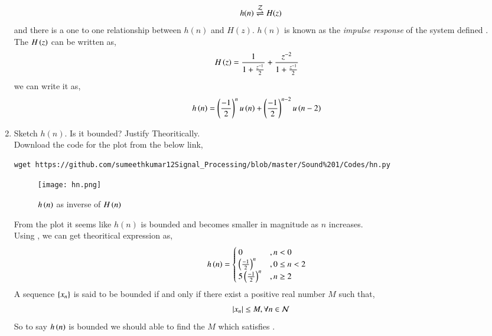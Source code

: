 \documentclass[journal,12pt,twocolumn]{IEEEtran}
\renewcommand\thesection{\arabic{section}}
\begin{document}
\begin{enumerate}[label=\thesection.\arabic*]
\begin{equation}
        h(n) \overset{\mathcal{Z}}{ \rightleftharpoons} H(z)
      \end{equation}
      and there is a one to one relationship between $h(n)$ and $H(z)$. $h(n)$ is known as the {\em impulse response} of the system defined .\\ 
    \solution The $H\left(z\right)$ can be written as,
      \begin{align}
         H\left(z\right) &= \frac{1}{1 + \frac{z^{-1}}{2}} + \frac{z^{-2}}{1+\frac{z^{-1}}{2}}
      \end{align}
       we can write it as,
      \begin{align}
        h\left(n\right) &= \left(\frac{-1}{2}\right)^{n} u\left(n\right) + \left(\frac{-1}{2}\right)^{n-2} u\left(n-2\right)\label{eq:hn}
      \end{align}
    \item Sketch $h(n)$. Is it bounded? Justify Theoritically.\\
    \solution  Download the code for the plot  from the below link,
     \begin{lstlisting}
wget https://github.com/sumeethkumar12Signal_Processing/blob/master/Sound%201/Codes/hn.py
     \end{lstlisting}
     \begin{figure}[ht!]
      \centering
      \texttt{[image: hn.png]}
      \caption{$h\left(n\right)$ as inverse of $H\left(n\right)$}     
      \label{hn}
     \end{figure}
     From the plot it seems like $h(n)$ is bounded and becomes smaller in magnitude as $n$ increases.\\
    Using , we can get theoritical expression as, 
     \begin{align}
       h\left(n\right) &= \begin{cases}
                        0 &, n < 0\\
                        \left(\frac{-1}{2}\right)^n &, 0\leq n<2\\
                        5\left(\frac{-1}{2}\right)^n &, n \geq 2
                     \end{cases}\label{eq:hn_theo}
     \end{align}
    A sequence $\left\{x_n\right\}$ is said to be bounded if and only if there exist a positive real number $M$ such that,
         \begin{align}
           \left\vert x_n\right\vert \leq M , \forall n \in \mathcal{N}\label{def:bounded}
         \end{align}      
    So to say $h\left(n\right)$ is bounded we should able to find the $M$ which satisfies .\\

\end{enumerate}
\end{document}
